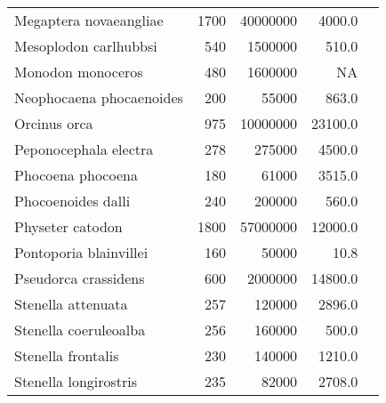 \begin{longtable}{|p{1in}rrrp{1.5in}|}
      Megaptera novaeangliae  &         1700 &    40000000  &       4000.0   &                                \citet{jefferson2008} \\
       Mesoplodon carlhubbsi  &          540 &     1500000  &        510.0   &                       \citet{jefferson2008,mead1982} \\
           Monodon monoceros  &          480 &     1600000  &           NA   &                                \citet{jefferson2008} \\
    Neophocaena phocaenoides  &          200 &       55000  &        863.0   &                                   \citet{kasuya1999} \\
                Orcinus orca  &          975 &    10000000  &      23100.0   &                       \citet{jefferson2008,ross1979} \\
       Peponocephala electra  &          278 &      275000  &       4500.0   &                                \citet{jefferson2008} \\
           Phocoena phocoena  &          180 &       61000  &       3515.0   &                                     \citet{read1999} \\
          Phocoenoides dalli  &          240 &      200000  &        560.0   &                                \citet{jefferson2008} \\
            Physeter catodon  &         1800 &    57000000  &      12000.0   &                                \citet{jefferson2008} \\
      Pontoporia blainvillei  &          160 &       50000  &         10.8   &                                \citet{jefferson2008} \\
        Pseudorca crassidens  &          600 &     2000000  &      14800.0   &                                \citet{jefferson2008} \\
          Stenella attenuata  &          257 &      120000  &       2896.0   &                       \citet{jefferson2008,hohn1985} \\
       Stenella coeruleoalba  &          256 &      160000  &        500.0   &                                 \citet{miyazaki1977} \\
          Stenella frontalis  &          230 &      140000  &       1210.0   &                                   \citet{perrin1994} \\
       Stenella longirostris  &          235 &       82000  &       2708.0   &                                \citet{jefferson2008} \\

\end{longtable}

